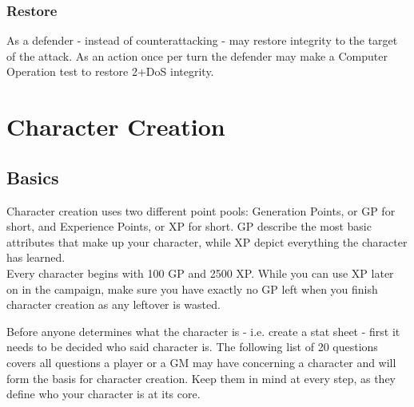 \documentclass[12pt,a4paper]{book}
\begin{document}
	\subsection*{Restore}
	As a defender - instead of counterattacking - may restore integrity to the target of the attack. As an action once per turn the defender may make a Computer Operation test to restore 2+DoS integrity.
	
	\chapter{Character Creation}
	\section{Basics}
	Character creation uses two different point pools: Generation Points, or GP for short, and Experience Points, or XP for short. GP describe the most basic attributes that make up your character, while XP depict everything the character has learned.\\
	Every character begins with 100 GP and 2500 XP. While you can use XP later on in the campaign, make sure you have exactly no GP left when you finish character creation as any leftover is wasted.
	
	Before anyone determines what the character is - i.e. create a stat sheet - first it needs to be decided who said character is. The following list of 20 questions covers all questions a player or a GM may have concerning a character and will form the basis for character creation. Keep them in mind at every step, as they define who your character is at its core.
	
\end{document}
